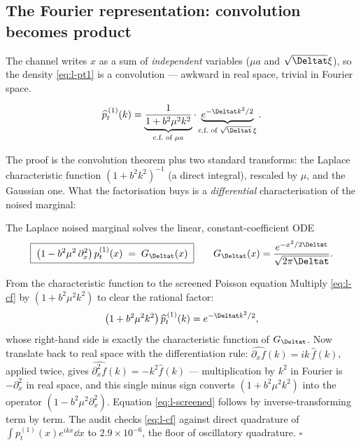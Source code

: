 \subsection{The Fourier representation: convolution becomes product}
\label{sec:l-fourier}

The channel writes $x$ as a sum of \emph{independent} variables
($\mu a$ and $\sqrt{\Deltat}\xi$), so the density \eqref{eq:l-pt1} is a
convolution --- awkward in real space, trivial in Fourier space.

\begin{proposition}\label{prop:l-cf}
\begin{equation}
  \widehat{p}_t^{\,(1)}(k)
  = \underbrace{\frac{1}{1 + b^2 \mu^2 k^2}}_{\text{c.f.\ of } \mu a}
    \cdot
    \underbrace{e^{-\Deltat k^2/2}}_{\text{c.f.\ of } \sqrt{\Deltat}\,\xi} .
  \label{eq:l-cf}
\end{equation}
\end{proposition}

The proof is the convolution theorem plus two standard transforms: the
Laplace characteristic function $(1 + b^2 k^2)^{-1}$ (a direct integral),
rescaled by $\mu$, and the Gaussian one. What the factorisation buys is a
\emph{differential} characterisation of the noised marginal:

\begin{theorem}\label{thm:l-screened}
The Laplace noised marginal solves the linear, constant-coefficient ODE
\begin{equation}
  \boxed{\;
  \big( 1 - b^2 \mu^2\, \partial_x^2 \big)\, p_t^{(1)}(x)
  \;=\; G_{\Deltat}(x)
  \;}
  \qquad
  G_{\Deltat}(x) = \frac{e^{-x^2/2\Deltat}}{\sqrt{2\pi \Deltat}} .
  \label{eq:l-screened}
\end{equation}
\end{theorem}

\begin{toolbox}{From the characteristic function to the screened Poisson
equation}
Multiply \eqref{eq:l-cf} by $(1 + b^2\mu^2 k^2)$ to clear the rational
factor:
\begin{equation*}
  \big( 1 + b^2 \mu^2 k^2 \big)\, \widehat{p}_t^{\,(1)}(k)
  = e^{-\Deltat k^2 / 2},
\end{equation*}
whose right-hand side is exactly the characteristic function of
$G_{\Deltat}$. Now translate back to real space with the differentiation
rule: $\widehat{\partial_x f}(k) = ik\,\widehat f(k)$, applied twice, gives
$\widehat{\partial_x^2 f}(k) = -k^2 \widehat f(k)$ --- multiplication by
$k^2$ in Fourier is $-\partial_x^2$ in real space, and this single minus
sign converts $(1 + b^2\mu^2 k^2)$ into the operator
$(1 - b^2\mu^2 \partial_x^2)$. Equation \eqref{eq:l-screened} follows by
inverse-transforming term by term. The audit checks \eqref{eq:l-cf} against
direct quadrature of $\int p_t^{(1)}(x) e^{ikx} \dd x$ to
$2.9 \times 10^{-6}$, the floor of oscillatory quadrature.
\hfill$\square$
\end{toolbox}

